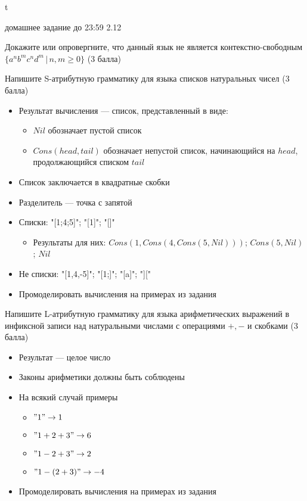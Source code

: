 t\documentclass[12pt]{article}
\begin{document}

{\Large домашнее задание до 23:59 2.12}
\bigskip

\enumerate
{
  \item Докажите или опровергните, что данный язык не является контекстно-свободным $\{ a^n b^m c^n d^m \, | \, n, m \geq 0 \}$ (3 балла)
  \item Напишите S-атрибутную грамматику для языка списков натуральных чисел (3 балла)
  \begin{itemize}
      \item Результат вычисления --- список, представленный в виде:
      \begin{itemize}
          \item $Nil$ обозначает пустой список
          \item $Cons(head, tail)$ обозначает непустой список, начинающийся на $head$, продолжающийся списком $tail$
      \end{itemize}
      \item Список заключается в квадратные скобки 
      \item Разделитель --- точка с запятой
      \item Списки: "[1;4;5]"; "[1]"; "[]"
      \begin{itemize}
          \item Результаты для них: $Cons(1, Cons(4, Cons(5, Nil)))$; $Cons(5, Nil)$; $Nil$
      \end{itemize}
      \item Не списки: "[1,4,-5]"; "[1;]"; "[a]"; "]["
      \item Промоделировать вычисления на примерах из задания
  \end{itemize}
  \item Напишите L-атрибутную грамматику для языка арифметических выражений в инфиксной записи над натуральными числами с операциями $+, -$ и скобками (3 балла)
  \begin{itemize}
      \item Результат --- целое число
      \item Законы арифметики должны быть соблюдены
      \item На всякий случай примеры
      \begin{itemize}
          \item $"1" \rightarrow 1$
          \item $"1+2+3" \rightarrow 6$
          \item $"1-2+3" \rightarrow 2$
          \item $"1-(2+3)" \rightarrow -4$
      \end{itemize}
      \item Промоделировать вычисления на примерах из задания
  \end{itemize}
}

 
\end{document}
